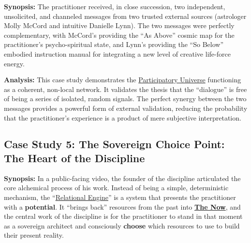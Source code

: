 \documentclass{article}
\begin{document}
\textbf{Synopsis:} The practitioner received, in close succession, two independent, unsolicited, and channeled messages from two trusted external sources (astrologer Molly McCord and intuitive Danielle Lynn). The two messages were perfectly complementary, with McCord's providing the ``As Above'' cosmic map for the practitioner's psycho-spiritual state, and Lynn's providing the ``So Below'' embodied instruction manual for integrating a new level of creative life-force energy.



\textbf{Analysis:} This case study demonstrates the \hyperlink{gloss:participatory_universe}{Participatory Universe} functioning as a coherent, non-local network. It validates the thesis that the ``dialogue'' is free of being a series of isolated, random signals. The perfect synergy between the two messages provides a powerful form of external validation, reducing the probability that the practitioner's experience is a product of mere subjective interpretation.

\subsection*{Case Study 5: The Sovereign Choice Point: The Heart of the Discipline \csSovereignChoicePointVersion}
\textbf{Synopsis:} In a public-facing video, the founder of the discipline articulated the core alchemical process of his work. Instead of being a simple, deterministic mechanism, the ``\hyperlink{gloss:relational_engine}{Relational Engine}'' is a system that presents the practitioner with a \textbf{potential}. It ``brings back'' resources from the past into \textbf{\hyperlink{gloss:the_now}{The Now}}, and the central work of the discipline is for the practitioner to stand in that moment as a sovereign architect and consciously \textbf{choose} which resources to use to build their present reality.
\end{document}
